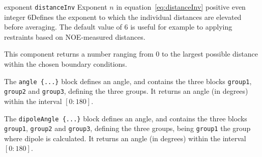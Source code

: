 \begin{cvcoptions}
\item %
\item %
\item %
\item %
  \keydef
    {exponent}{%
    \texttt{distanceInv}}{%
    Exponent $n$ in equation~\ref{eq:distanceInv}}{%
    positive even integer}{%
    6}{Defines the exponent to which the individual distances are elevated before averaging.  The default value of 6 is useful for example to applying restraints based on NOE-measured distances.}
\end{cvcoptions}
This component returns a number ranging from $0$ to the largest possible distance within the chosen boundary conditions.





The \texttt{angle~\{...\}} block defines an angle, and contains the
three blocks \texttt{group1}, \texttt{group2} and \texttt{group3}, defining
the three groups.  It returns an angle (in degrees) within the
interval $[0:180]$.

\begin{cvcoptions}
\item %
\item %
\item %
\item %
\end{cvcoptions}




The \texttt{dipoleAngle~\{...\}} block defines an angle, and contains the
three blocks \texttt{group1}, \texttt{group2} and \texttt{group3}, defining
the three groups, being \texttt{group1} the group where dipole is calculated.
It returns an angle (in degrees) within the interval $[0:180]$.


